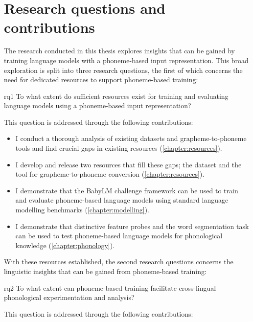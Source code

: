\section{Research questions and contributions}

The research conducted in this thesis explores insights that can be gained by training language models with a phoneme-based input representation. This broad exploration is split into three research questions, the first of which concerns the need for dedicated resources to support phoneme-based training:

\begin{question}{1}{rq1}
    To what extent do sufficient resources exist for training and evaluating language models using a phoneme-based input representation?
\end{question}

This question is addressed through the following contributions:

\begin{itemize}
    \item I conduct a thorough analysis of existing datasets and grapheme-to-phoneme tools and find crucial gaps in existing resources (\cref{chapter:resources}).
    \item I develop and release two resources that fill these gaps; the \ipachildes dataset and the \gpp tool for grapheme-to-phoneme conversion (\cref{chapter:resources}).
    \item I demonstrate that the BabyLM challenge framework can be used to train and evaluate phoneme-based language models using standard language modelling benchmarks (\cref{chapter:modelling}).
    \item I demonstrate that distinctive feature probes and the word segmentation task can be used to test phoneme-based language models for phonological knowledge (\cref{chapter:phonology}).
\end{itemize}

With these resources established, the second research questions concerns the linguistic insights that can be gained from phoneme-based training:

\begin{question}{}{rq2}
    To what extent can phoneme-based training facilitate cross-lingual phonological experimentation and analysis?
\end{question}

This question is addressed through the following contributions:

